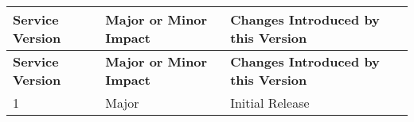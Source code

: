 \begin{longtable}{|>{\raggedright}p{}|>{\raggedright}p{}|>{\raggedright}p{}|}
\hline
\hline 
\textbf{\footnotesize{Service Version}} & \textbf{\footnotesize{Major or Minor Impact}} & \textbf{\footnotesize{Changes Introduced by this Version}}\tabularnewline
\hline 
\hline
\endfirsthead
\hline
\hline 
\textbf{\footnotesize{Service Version}} & \textbf{\footnotesize{Major or Minor Impact}} & \textbf{\footnotesize{Changes Introduced by this Version}}\tabularnewline
\hline 
\hline
\endhead
\hline 
{\footnotesize{1}} & {\footnotesize{Major}} & {\footnotesize{Initial Release}}\tabularnewline
\hline 
\end{longtable}
